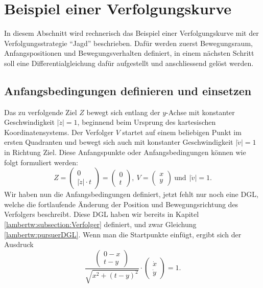%
%
%
\section{Beispiel einer Verfolgungskurve
\label{lambertw:section:teil4}}
In diesem Abschnitt wird rechnerisch das Beispiel einer Verfolgungskurve mit der Verfolgungsstrategie ``Jagd'' beschrieben. Dafür werden zuerst Bewegungsraum, Anfangspositionen und Bewegungsverhalten definiert, in einem nächsten Schritt soll eine Differentialgleichung dafür aufgestellt und anschliessend gelöst werden.

\subsection{Anfangsbedingungen definieren und einsetzen
	\label{lambertw:subsection:Anfangsbedingungen}}
Das zu verfolgende Ziel \(Z\) bewegt sich entlang der \(y\)-Achse mit konstanter Geschwindigkeit \(|\dot{z}| = 1\), beginnend beim Ursprung des kartesischen Koordinatensystems. Der Verfolger \(V\) startet auf einem beliebigen Punkt im ersten Quadranten und bewegt sich auch mit konstanter Geschwindigkeit \(|\dot{v}| = 1\) in Richtung Ziel. Diese Anfangspunkte oder Anfangsbedingungen können wie folgt formuliert werden:
\begin{equation}
	Z
	=
	\left( \begin{array}{c} 0 \\ |\dot{z}| \cdot t \end{array} \right)
	=
	\left( \begin{array}{c} 0 \\ t \end{array} \right)
	,\:
	V
	=
	\left( \begin{array}{c} x \\ y \end{array} \right)
	\:\text{und}\:\:
	|\dot{v}|
	=
	1.
	\label{lambertw:Anfangsbed}
\end{equation}
Wir haben nun die Anfangsbedingungen definiert, jetzt fehlt nur noch eine DGL, welche die fortlaufende Änderung der Position und Bewegungsrichtung des Verfolgers beschreibt. 
Diese DGL haben wir bereits in Kapitel \ref{lambertw:subsection:Verfolger} definiert, und zwar Gleichung \eqref{lambertw:pursuerDGL}. Wenn man die Startpunkte einfügt, ergibt sich der Ausdruck
\begin{equation}
	\frac{\left( \begin{array}{c} 0-x \\ t-y \end{array} \right)}{\sqrt{x^2 + (t-y)^2}}
	\cdot
	\left(\begin{array}{c} \dot{x} \\ \dot{y} \end{array}\right)
	=
	1.
	\label{lambertw:eqMitAnfangsbed}
\end{equation}

